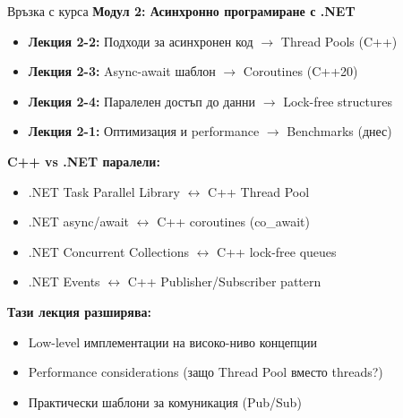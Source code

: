 \documentclass[aspectratio=169]{beamer}
\begin{document}
\begin{frame}{Връзка с курса}
\textbf{Модул 2: Асинхронно програмиране с .NET}

\begin{itemize}
    \item \textbf{Лекция 2-2:} Подходи за асинхронен код $\rightarrow$ Thread Pools (C++)
    \item \textbf{Лекция 2-3:} Async-await шаблон $\rightarrow$ Coroutines (C++20)
    \item \textbf{Лекция 2-4:} Паралелен достъп до данни $\rightarrow$ Lock-free structures
    \item \textbf{Лекция 2-1:} Оптимизация и performance $\rightarrow$ Benchmarks (днес)
\end{itemize}

\vspace{0.4cm}

\textbf{C++ vs .NET паралели:}
\begin{itemize}
    \item .NET Task Parallel Library $\leftrightarrow$ C++ Thread Pool
    \item .NET async/await $\leftrightarrow$ C++ coroutines (co\_await)
    \item .NET Concurrent Collections $\leftrightarrow$ C++ lock-free queues
    \item .NET Events $\leftrightarrow$ C++ Publisher/Subscriber pattern
\end{itemize}

\vspace{0.4cm}

\textbf{Тази лекция разширява:}
\begin{itemize}
    \item Low-level имплементации на високо-ниво концепции
    \item Performance considerations (защо Thread Pool вместо threads?)
    \item Практически шаблони за комуникация (Pub/Sub)
\end{itemize}
\end{frame}
\end{document}
